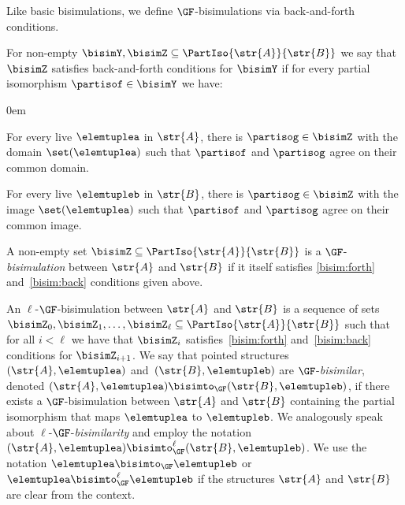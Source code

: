 Like basic bisimulations, we define $\GF$-bisimulations via back-and-forth conditions.
\begin{definition}
For non-empty $\bisimY, \bisimZ \subseteq \PartIso{\str{A}}{\str{B}}$ we say that $\bisimZ$ satisfies back-and-forth conditions for $\bisimY$ if for every partial isomorphism $\partisof \in \bisimY$ we have:
%
\begin{description}\itemsep0em
  \item[\desclabel{(Forth)}{bisim:forth}] For every live $\elemtuplea$ in $\str{A}$, there is $\partisog \in \bisimZ$ with the domain $\set(\elemtuplea)$ such that $\partisof$ and $\partisog$ agree on their common domain.
  \item[\desclabel{(Back)}{bisim:back}] For every live $\elemtupleb$ in $\str{B}$, there is $\partisog \in \bisimZ$ with the image $\set(\elemtuplea)$ such that $\partisof$ and $\partisog$ agree on their common image.
\end{description}
A non-empty set $\bisimZ \subseteq \PartIso{\str{A}}{\str{B}}$ is a $\GF$-\emph{bisimulation} between $\str{A}$ and $\str{B}$ if it itself satisfies \ref{bisim:forth} and~\ref{bisim:back} conditions given above.
\end{definition}
An $\ell$-$\GF$-bisimulation between $\str{A}$ and $\str{B}$ is a sequence of sets $\bisimZ_0, \bisimZ_1, \ldots, \bisimZ_\ell \subseteq \PartIso{\str{A}}{\str{B}}$ such that for all $i < \ell$ we have that $\bisimZ_i$ satisfies~\ref{bisim:forth} and~\ref{bisim:back} conditions for $\bisimZ_{i{+}1}$.
We say that pointed structures $(\str{A}, \elemtuplea)$ and~$(\str{B}, \elemtupleb)$ are $\GF$-\emph{bisimilar}, denoted $(\str{A}, \elemtuplea) \bisimto_{\GF} (\str{B}, \elemtupleb)$, if there exists a $\GF$-bisimulation between $\str{A}$ and $\str{B}$ containing the partial isomorphism that maps $\elemtuplea$ to $\elemtupleb$.
We analogously speak about $\ell$-$\GF$-\emph{bisimilarity} and employ the notation $(\str{A}, \elemtuplea) \bisimto_{\GF}^{\ell} (\str{B}, \elemtupleb)$.
We use the notation $\elemtuplea \bisimto_{\GF} \elemtupleb$ or $\elemtuplea \bisimto_{\GF}^{\ell} \elemtupleb$ if the structures $\str{A}$ and $\str{B}$ are clear from the context.

